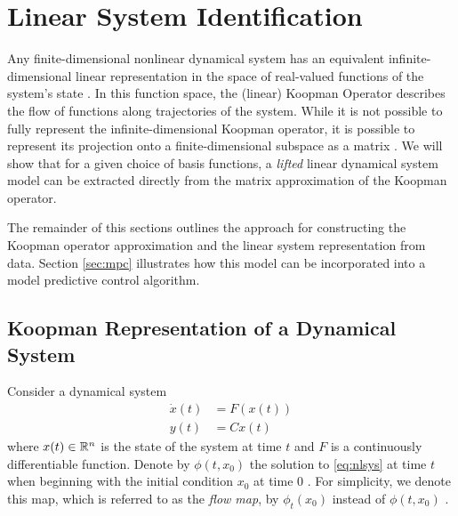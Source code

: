 \section{Linear System Identification}
\label{sec:sysid}

Any finite-dimensional nonlinear dynamical system has an equivalent infinite-dimensional linear representation in the space of real-valued functions of the system's state \cite{mauroy2016linear} .
In this function space, the (linear) Koopman Operator describes the flow of functions along trajectories of the system.
While it is not possible to fully represent the infinite-dimensional Koopman operator, it is possible to represent its projection onto a finite-dimensional subspace as a matrix .
We will show that for a given choice of basis functions, a \emph{lifted} linear dynamical system model can be extracted directly from the matrix approximation of the Koopman operator.  

The remainder of this sections outlines the approach for constructing the Koopman operator approximation and the linear system representation from data.
Section \ref{sec:mpc} illustrates how this model can be incorporated into a model predictive control algorithm.

\subsection{Koopman Representation of a Dynamical System}

Consider a dynamical system
\begin{align}
    \dot{x}(t) &= F (x(t)) \\
    y(t) &= C x(t)
    \label{eq:nlsys}
\end{align}
where $x(t) \in \mathbb{R}^n$ is the state of the system at time $t$ and ${F}$ is a continuously differentiable function.
Denote by $\phi(t,x_0)$ the solution to \eqref{eq:nlsys} at time $t$ when beginning with the initial condition $x_0$ at time $0$ .
For simplicity, we denote this map, which is referred to as the \emph{flow map}, by $\phi_t (x_0)$ instead of $\phi (t, x_0)$ .

